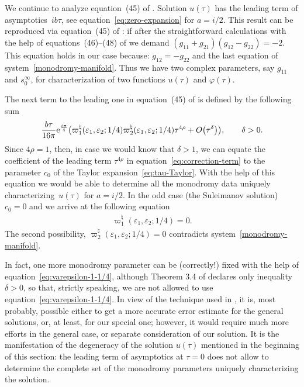\documentclass[pdftex]{sigma}
\numberwithin{equation}{section}
\begin{document}
We continue to analyze equation~(45) of \cite{KV2004}. Solution $u(\tau)$ has the leading term of
asympto\-tics~$ib\tau$, see equation~\eqref{eq:zero-expansion} for $a=i/2$. This result can be reproduced
via equation~(45) of \cite{KV2004}: if after the straightforward calculations with the help of
equations~(46)--(48) of \cite{KV2004} we demand $(g_{11}+g_{21})(g_{12}-g_{22})=-2$. This equation holds
in our case because: $g_{12}=-g_{22}$ and the last equation of system~\eqref{monodromy-manifold}.
Thus we have two complex parameters, say $g_{11}$ and $s_0^\infty$, for characterization of two functions
$u(\tau)$ and $\varphi(\tau)$.

The next term to the leading one in equation~(45) of \cite{KV2004} is defined by the following sum
\begin{gather}\label{eq:correction-term}
\frac{b\tau}{16\pi}{\rm e}^{\frac{i\pi}4}
\big(\varpi_1^\natural(\varepsilon_1,\varepsilon_2;1/4)\varpi_2^\natural(\varepsilon_1,\varepsilon_2;1/4)
\tau^{4\rho}+O\big(\tau^\delta\big)\big),\qquad\delta>0.
\end{gather}
Since $4\rho=1$, then, in case we would know that $\delta>1$, we can equate the coefficient of the leading term
$\tau^{4\rho}$ in equation~\eqref{eq:correction-term} to the parameter $c_0$ of the Taylor
expansion~\eqref{eq:tau-Taylor}.
With the help of this equation we would be able to determine all the monodromy data uniquely characteri\-zing~$u(\tau)$ for $a=i/2$. In the odd case (the Suleimanov solution) $c_0=0$ and we arrive at the following equation
\begin{gather}\label{eq:varepsilon-1-1/4}
\varpi_1^\natural(\varepsilon_1,\varepsilon_2;1/4)=0.
\end{gather}
The second possibility, $\varpi_2^\natural(\varepsilon_1,\varepsilon_2;1/4)=0$ contradicts
system~\eqref{monodromy-manifold}.

In fact, one more monodromy parameter can be (correctly!) fixed with the help of equation~\eqref{eq:varepsilon-1-1/4},
although Theorem 3.4 of \cite{KV2004} declares only inequality $\delta>0$, so that, strictly speaking, we are not
allowed to use equation~\eqref{eq:varepsilon-1-1/4}.
In view of the technique used in \cite{KV2004}, it is, most probably, possible either to get a more accurate error
estimate for the general solutions, or, at least, for our special one; however, it would require much more efforts
in the general case, or separate consideration of our solution.
It is the manifestation of the degeneracy of the solution $u(\tau)$ mentioned in the beginning of this section:
the leading term of asymptotics at $\tau=0$ does not allow to determine the complete set of the monodromy parameters
uniquely characterizing the solution.
\end{document}
